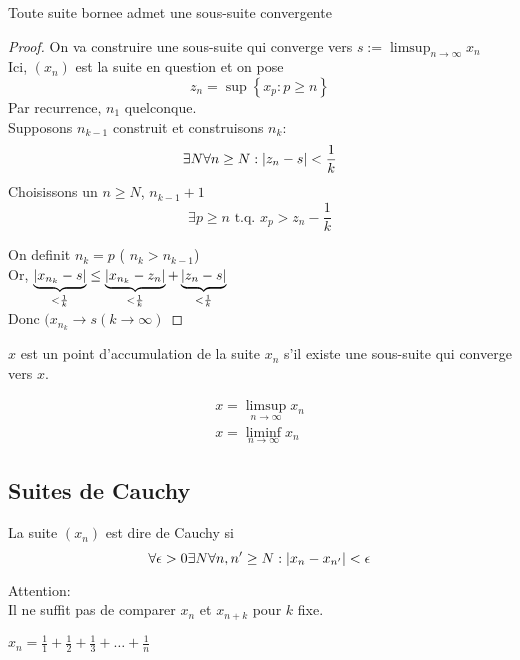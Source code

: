 \documentclass[../main.tex]{subfiles}
\begin{document}
\begin{thm}\label{thm:bolzano_weierstrass}
	Toute suite bornee admet une sous-suite convergente
\end{thm}
\begin{proof}
On va construire une sous-suite qui converge vers $s:= \limsup_{n \to \infty } x_n$ \\
Ici, $(x_n)$ est la suite en question et on pose
\[ 
z_n = \sup \left\{ x_p : p \geq n \right\} 
\]
Par recurrence, $n_1$ quelconque.\\
Supposons $n_{k-1} $ construit et construisons $n_k$:
\[ 
	\exists N \forall n \geq N : \left\vert z_n -s\right\vert < \frac{1}{k}
\]
Choisissons un $n \geq N$, $n_{k-1} +1 $
\[ 
\exists p \geq n \text{ t.q. } x_p > z_n - \frac{1}{k}
\]

On definit $n_k = p$ ( $n_k > n_{k-1} $)\\
Or, $ \underbrace{\left\vert x_{n_k} -s\right\vert}_{< \frac{1}{k}} \leq \underbrace{\left\vert x_{n_k} -z_n\right\vert}_{< \frac{1}{k}} + \underbrace{\left\vert z_n -s \right\vert}_{<\frac{1}{k}}$\\
Donc $(x_{n_k} \to s ( k \to \infty )$
\end{proof}
\begin{defn}\label{defn:point_d_accumulation}
	$x$ est un point d'accumulation de la suite $x_n$ s'il existe une sous-suite qui converge vers $x$.
\end{defn}
\begin{exemple}
	\begin{align*}
	x= \limsup_{n \to \infty} x_n\\
	x = \liminf_{n \to \infty } x_n
	\end{align*}
\end{exemple}
\subsection{Suites de Cauchy}
\begin{defn}\label{defn:suites_de_cauchy}
	La suite $(x_n)$ est dire de Cauchy si 
	\[ 
		\forall \epsilon > 0 \exists N \forall n,n' \geq N: \left\vert x_n -x_{n'}\right\vert < \epsilon
	\]
\end{defn}
Attention:\\
Il ne suffit pas de comparer $x_n$ et $x_{n+k} $ pour $k$ fixe.
\begin{exemple}
$x_n = \frac{1}{1} + \frac{1}{2} + \frac{1}{3} + \ldots + \frac{1}{n}$
\end{exemple}
\end{document}
